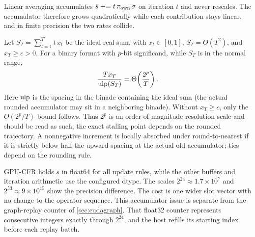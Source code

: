 Linear averaging \cite{tammelin2014solving} accumulates
$\bar{s} \mathrel{+}= t\,\pi_{\mathrm{own}}\,\sigma$ on iteration $t$ and never
rescales. The accumulator therefore grows quadratically while each contribution stays
linear, and in finite precision the two rates collide.

\begin{proposition}
\label{prop:horizon}
Let $S_T = \sum_{t=1}^{T} t\,x_t$ be the ideal real sum, with
$x_t\in[0,1]$, $S_T = \Theta(T^2)$, and $x_T\ge c>0$.
For a binary format with $p$-bit significand, while $S_T$ is in the normal range,
\begin{equation}
    \frac{T x_T}{\mathrm{ulp}(S_T)} = \Theta\!\left(\frac{2^p}{T}\right).
    \label{eq:horizon}
\end{equation}
Here $\mathrm{ulp}$ is the spacing in the binade containing the ideal sum (the
actual rounded accumulator may sit in a neighboring binade). Without $x_T\ge c$, only the $O(2^p/T)$ bound
follows. Thus $2^p$ is an order-of-magnitude resolution scale and should be read as such;
the exact stalling point depends on the rounded trajectory. A nonnegative increment is locally absorbed under
round-to-nearest if it is strictly below half the upward spacing
at the actual old accumulator; ties depend on the rounding rule.
\end{proposition}

GPU-CFR holds $\bar{s}$ in float64 for all update rules, while the other buffers
and iteration arithmetic use the configured dtype. The scales
$2^{24}\approx1.7\times10^7$ and $2^{53}\approx9\times10^{15}$ show the precision
difference. The cost is one wider slot vector with no change to the operator
sequence. This accumulator issue is separate from the graph-replay counter of
\cref{sec:cudagraph}. That float32 counter represents consecutive integers exactly
through $2^{24}$, and the host refills its starting index before each replay batch.
